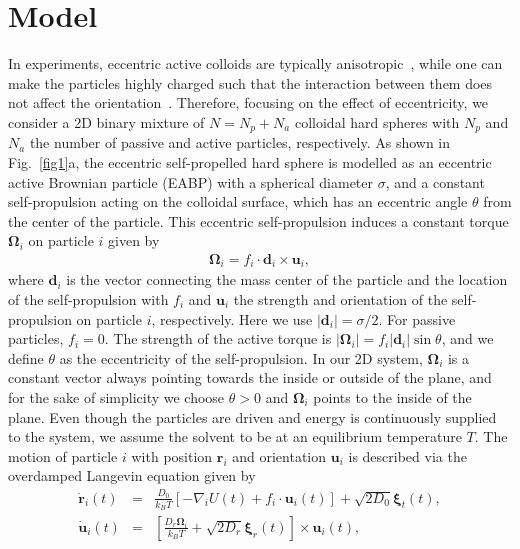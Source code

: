 \documentclass[prl, twocolumn, showpacs, preprintnumbers,amsmath,amssymb]{revtex4-1}
\begin{document}
\section{Model}
In experiments, eccentric active colloids are typically anisotropic~\cite{hagen2014gravitaxis,circuleswim}, while one can make the particles highly charged such that the interaction between them does not affect the orientation~\cite{liubin2014}. Therefore, focusing on the effect of eccentricity, we consider a 2D binary mixture of $N = N_p + N_a$ colloidal hard spheres with $N_p$ and $N_a$ the number of passive and active particles, respectively. 
As shown in Fig.~\ref{fig1}a, the eccentric self-propelled hard sphere is modelled as an eccentric active Brownian particle (EABP) with a spherical diameter $\sigma$, and a constant self-propulsion acting on the colloidal surface, which has an eccentric angle $\theta$ from the center of the particle. 
This eccentric self-propulsion induces a constant torque $\mathbf{\Omega}_i$ on particle $i$ given by
\begin{eqnarray}
{\bm \Omega}_i = f_i  \cdot \textbf{d}_i \times \textbf{u}_i,
\end{eqnarray}
where $\mathbf{d}_i$ is the vector connecting the mass center of the particle and the location of the self-propulsion with $f_i$ and $\mathbf{u}_i$ the strength and orientation of the self-propulsion on particle $i$, respectively. Here we use $|\mathbf{d}_i| = \sigma/2$. For passive particles, $f_i = 0$. The strength of the active torque is $|\mathbf{\Omega}_i| = f_i |\mathbf{d}_i| \sin \theta$, and we define $\theta$ as the eccentricity of the self-propulsion.
In our 2D system, $\mathbf{\Omega}_i$ is a constant vector always pointing towards the inside or outside of the plane, and for the sake of simplicity we choose $\theta > 0$ and $\mathbf{\Omega}_i$ points to the inside of the plane. Even though the particles are driven and energy is continuously supplied to the system, we assume the solvent to be at an equilibrium temperature $T$.
The motion of particle $i$ with position $\mathbf{r}_i$ and orientation $\mathbf{u}_i$ is described via the overdamped Langevin equation given by
\begin{eqnarray}
\dot{\textbf{r}}_i(t) &=& \frac{D_0}{k_BT} \left[-{\nabla}_i U(t) + f_i\cdot \textbf{u}_i(t)\right] + \sqrt{2D_0}{\bm \xi}_t(t),\\
\dot{\textbf{u}}_i(t) &=&   \left[ \frac{D_r {\bm \Omega}_i}{k_BT} + \sqrt{2D_r}{\bm \xi}_r(t)\right] \times {\textbf{u}}_i(t),
\end{eqnarray}
\end{document}

